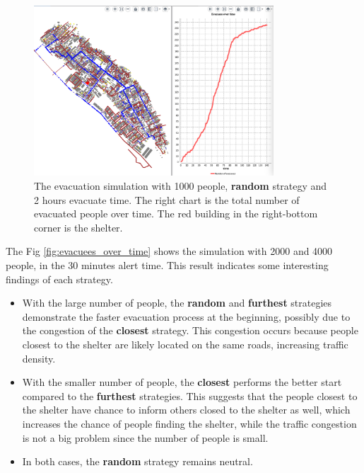 \documentclass[12pt]{article}
\begin{document}
\begin{figure}
    \centering
    \includegraphics[width=0.8\textwidth]{../images/single-simulation.png}
    \caption{The evacuation simulation with 1000 people, \textbf{random} strategy and 2 hours evacuate time. The right chart is the total number of evacuated people over time. The red building in the right-bottom corner is the shelter.}
    \label{fig:results-single}
\end{figure}

The Fig \ref{fig:evacuees_over_time} shows the simulation with 2000 and 4000 people, in the 30 minutes alert time. This result indicates some interesting findings of each strategy.
\begin{itemize}
    \item With the large number of people, the \textbf{random} and \textbf{furthest} strategies demonstrate the faster evacuation process at the beginning, possibly due to the congestion of the \textbf{closest} strategy. This congestion occurs because people closest to the shelter are likely located on the same roads, increasing traffic density.
    \item With the smaller number of people, the \textbf{closest} performs the better start compared to the \textbf{furthest} strategies. This suggests that the people closest to the shelter have chance to inform others closed to the shelter as well, which increases the chance of people finding the shelter, while the traffic congestion is not a big problem since the number of people is small.
    \item In both cases, the \textbf{random} strategy remains neutral.
\end{itemize}
\end{document}

